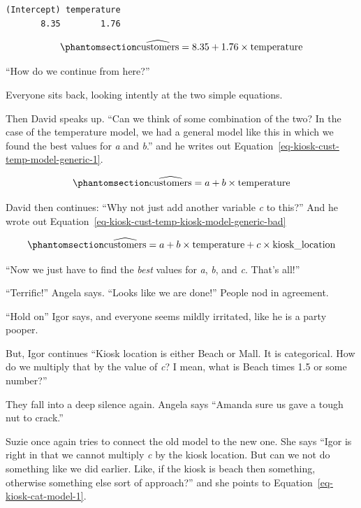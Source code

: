 \documentclass[
  12pt,
  letterpaper,
  DIV=11,
  numbers=noendperiod]{scrreprt}
\begin{document}
\begin{lstlisting}
(Intercept) temperature 
       8.35        1.76 
\end{lstlisting}

\begin{equation}\phantomsection\label{eq-kiosk-cust-temp-model-2}{
\widehat{\text{customers}} = 8.35 +  1.76\times \text{temperature}
}\end{equation}

``How do we continue from here?''

Everyone sits back, looking intently at the two simple equations.

Then David speaks up. ``Can we think of some combination of the two? In
the case of the temperature model, we had a general model like this in
which we found the best values for \emph{a} and \emph{b}.'' and he
writes out Equation~\ref{eq-kiosk-cust-temp-model-generic-1}.

\begin{equation}\phantomsection\label{eq-kiosk-cust-temp-model-generic-1}{
\widehat{\text{customers}} = a +  b\times\text{temperature}
}\end{equation}

David then continues: ``Why not just add another variable \emph{c} to
this?'' And he wrote out
Equation~\ref{eq-kiosk-cust-temp-kiosk-model-generic-bad}

\begin{equation}\phantomsection\label{eq-kiosk-cust-temp-kiosk-model-generic-bad}{
\widehat{\text{customers}} = a +  b\times\text{temperature} + c\times \text{kiosk\_location}
}\end{equation}

``Now we just have to find the \emph{best} values for \emph{a},
\emph{b}, and \emph{c}. That's all!''

``Terrific!'' Angela says. ``Looks like we are done!'' People nod in
agreement.

``Hold on'' Igor says, and everyone seems mildly irritated, like he is a
party pooper.

But, Igor continues ``Kiosk location is either Beach or Mall. It is
categorical. How do we multiply that by the value of \emph{c}? I mean,
what is Beach times 1.5 or some number?''

They fall into a deep silence again. Angela says ``Amanda sure us gave a
tough nut to crack.''

Suzie once again tries to connect the old model to the new one. She says
``Igor is right in that we cannot multiply \emph{c} by the kiosk
location. But can we not do something like we did earlier. Like, if the
kiosk is beach then something, otherwise something else sort of
approach?'' and she points to Equation~\ref{eq-kiosk-cat-model-1}.
\end{document}
